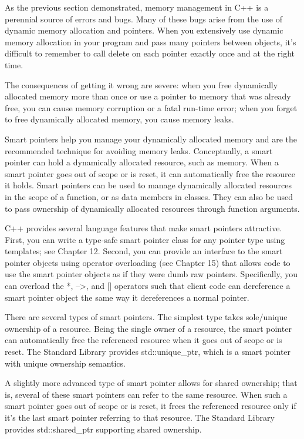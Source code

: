 
As the previous section demonstrated, memory management in C++ is a perennial source of errors and bugs. Many of these bugs arise from the use of dynamic memory allocation and pointers. When you extensively use dynamic memory allocation in your program and pass many pointers between objects, it’s difficult to remember to call delete on each pointer exactly once and at the right time.

The consequences of getting it wrong are severe: when you free dynamically allocated memory more than once or use a pointer to memory that was already free, you can cause memory corruption or a fatal run-time error; when you forget to free dynamically allocated memory, you cause memory leaks.

Smart pointers help you manage your dynamically allocated memory and are the recommended technique for avoiding memory leaks. Conceptually, a smart pointer can hold a dynamically allocated resource, such as memory. When a smart pointer goes out of scope or is reset, it can automatically free the resource it holds. Smart pointers can be used to manage dynamically allocated resources in the scope of a function, or as data members in classes. They can also be used to pass ownership of dynamically allocated resources through function arguments.

C++ provides several language features that make smart pointers attractive. First, you can write a type-safe smart pointer class for any pointer type using templates; see Chapter 12. Second, you can provide an interface to the smart pointer objects using operator overloading (see Chapter 15) that allows code to use the smart pointer objects as if they were dumb raw pointers. Specifically, you can overload the *, –>, and [] operators such that client code can dereference a smart pointer object the same way it dereferences a normal pointer.

There are several types of smart pointers. The simplest type takes sole/unique ownership of a resource. Being the single owner of a resource, the smart pointer can automatically free the referenced resource when it goes out of scope or is reset. The Standard Library provides std::unique\_ptr, which is a smart pointer with unique ownership semantics.

A slightly more advanced type of smart pointer allows for shared ownership; that is, several of these smart pointers can refer to the same resource. When such a smart pointer goes out of scope or is reset, it frees the referenced resource only if it’s the last smart pointer referring to that resource. The Standard Library provides std::shared\_ptr supporting shared ownership.

